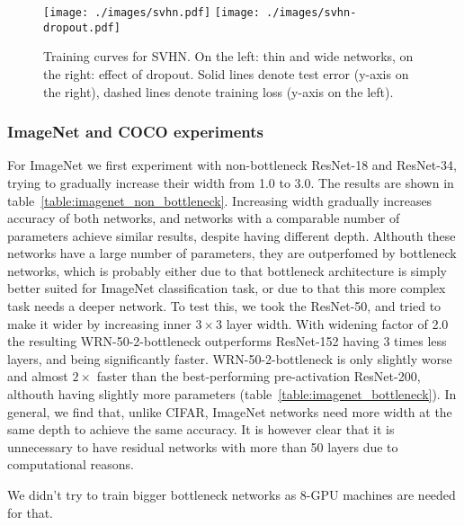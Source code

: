 \documentclass{bmvc2k}
\begin{document}
\begin{figure}
  \centering
  \vspace{0.1cm}
  \texttt{[image: ./images/svhn.pdf]}
  \texttt{[image: ./images/svhn-dropout.pdf]}
  \caption{Training curves for SVHN. On the left: thin and wide networks, on the right: effect of dropout. Solid lines denote test error (y-axis on the right), dashed lines denote training loss (y-axis on the left).}
\label{fig:dropout-svhn}
\end{figure}


\subsubsection*{ImageNet and COCO experiments}

For ImageNet we first experiment with non-bottleneck ResNet-18 and ResNet-34, trying to gradually increase their width from 1.0 to 3.0. The results are shown in table~\ref{table:imagenet_non_bottleneck}. Increasing width gradually increases accuracy of both networks, and networks with a comparable number of parameters achieve similar results, despite having different depth. Althouth these networks have a large number of parameters, they are outperfomed by bottleneck networks, which is probably either due to that  bottleneck architecture is simply better suited for ImageNet classification task, or due to that this more complex task needs a deeper network. To test this, we took the ResNet-50, and tried to make it wider by increasing inner $3\times3$ layer width. With widening factor of 2.0 the resulting WRN-50-2-bottleneck outperforms ResNet-152 having 3 times less layers, and being significantly faster. WRN-50-2-bottleneck is only slightly worse and almost $2\times$ faster than the best-performing pre-activation ResNet-200, althouth having slightly more parameters (table~\ref{table:imagenet_bottleneck}). In general, we find that, unlike CIFAR, ImageNet networks need more width at the same depth to achieve the same accuracy. It is however clear that it is unnecessary to have residual networks with more than 50 layers due to computational reasons.

We didn't try to train bigger bottleneck networks as 8-GPU machines are needed for that.
\end{document}
